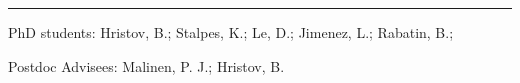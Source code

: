 
\rule[3pt]{425.5pt}{.1mm}

\noindent PhD students: Hristov, B.; Stalpes, K.; Le, D.; Jimenez, L.; Rabatin,
B.;

\noindent Postdoc Advisees: Malinen, P. J.; Hristov, B.
